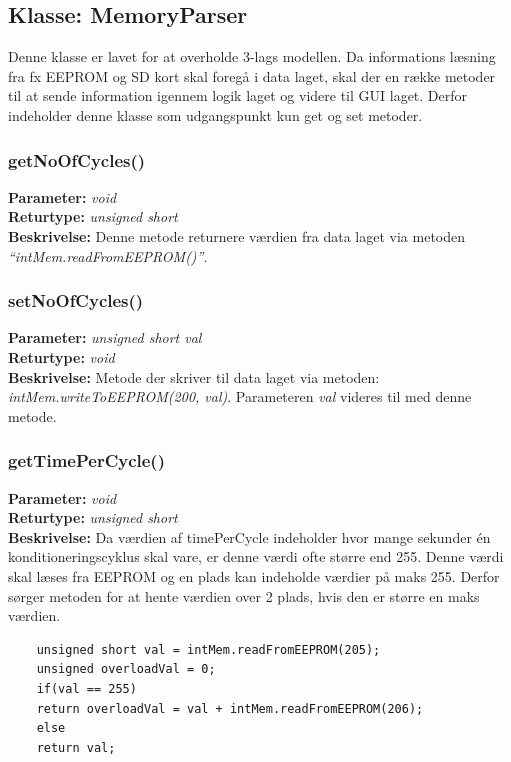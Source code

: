 \subsection{Klasse: MemoryParser}
Denne klasse er lavet for at overholde 3-lags modellen. Da informations læsning fra fx EEPROM og SD kort skal foregå i data laget, skal der en række metoder til at sende information igennem logik laget og videre til GUI laget. Derfor indeholder denne klasse som udgangspunkt kun get og set metoder. 

\subsubsection{getNoOfCycles()}
\textbf{Parameter: } \textit{void}
\\ \textbf{Returtype: } \textit{unsigned short}
\\ \textbf{Beskrivelse: } Denne metode returnere værdien fra data laget via metoden \textit{“intMem.readFromEEPROM()”}.

\subsubsection{setNoOfCycles()}
\textbf{Parameter: } \textit{unsigned short val}
\\ \textbf{Returtype: } \textit{void}
\\ \textbf{Beskrivelse: } Metode der skriver til data laget via metoden: \textit{intMem.writeToEEPROM(200, val)}. Parameteren \textit{val} videres til med denne metode. 

\subsubsection{getTimePerCycle()}
\textbf{Parameter: } \textit{void}
\\ \textbf{Returtype: } \textit{unsigned short}
\\ \textbf{Beskrivelse: } Da værdien af timePerCycle indeholder hvor mange sekunder én konditioneringscyklus skal vare, er denne værdi ofte større end 255. Denne værdi skal læses fra EEPROM og en plads kan indeholde værdier på maks 255. Derfor sørger metoden for at hente værdien over 2 plads, hvis den er større en maks værdien. 
\begin{lstlisting}
	unsigned short val = intMem.readFromEEPROM(205);
	unsigned overloadVal = 0;
	if(val == 255)
	return overloadVal = val + intMem.readFromEEPROM(206);
	else
	return val;
\end{lstlisting}


